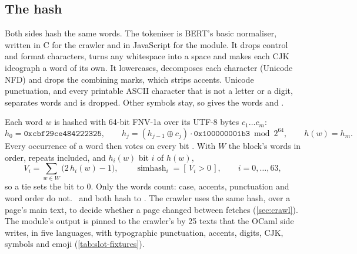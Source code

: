 \subsection{The hash}\label{app:slot-hash}

Both sides hash the same words. The tokeniser is BERT's basic normaliser,
written in C for the crawler and in JavaScript for the module. It drops control
and format characters, turns any whitespace into a space and makes each CJK
ideograph a word of its own. It lowercases, decomposes each character
(Unicode NFD) and drops the combining marks, which strips accents. Unicode
punctuation, and every printable ASCII character that is not a letter or a
digit, separates words and is dropped. Other symbols stay, so 
gives the words  and .

Each word $w$ is hashed with 64-bit FNV-1a over its UTF-8 bytes
$c_1 \dots c_m$:
\begin{equation}\label{eq:slot-fnv}
h_0 = \mathtt{0xcbf29ce484222325},\qquad
h_j = (h_{j-1} \oplus c_j)\cdot \mathtt{0x100000001b3} \bmod 2^{64},\qquad
h(w) = h_m.
\end{equation}
Every occurrence of a word then votes on every bit
\citep{charikar2002similarity}. With $W$ the block's words in order, repeats
included, and $h_i(w)$ bit $i$ of $h(w)$,
\begin{equation}\label{eq:slot-simhash}
V_i = \sum_{w \in W} \bigl(2\,h_i(w) - 1\bigr),\qquad
\operatorname{simhash}_i = [\,V_i > 0\,],\qquad i = 0, \dots, 63,
\end{equation}
so a tie sets the bit to 0. Only the words count: case, accents, punctuation
and word order do not. \ and 
both hash to . The crawler uses the same hash, over a
page's main text, to decide whether a page changed between fetches
(\cref{sec:crawl}). The module's output is pinned to the crawler's by 25 texts
that the OCaml side writes, in five languages, with typographic punctuation,
accents, digits, CJK, symbols and emoji (\cref{tab:slot-fixtures}).

